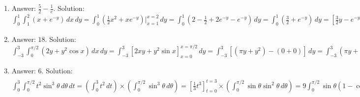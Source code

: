 \begin{Answer}[ref = iterate_1]
\begin{enumerate}
\item Answer: $\frac{5}{2} - \frac{1}{e}$. Solution: $\int_0^1 \int_1^2 \left( 
x + e^{-y} \right)\,dx\,dy = \int_0^1 \left( \frac{1}{2}x^2 + xe^{-y} \right)
|_{x=1}^{x=2}\,dy = \int_0^1 \left( 2 - \frac{1}{2} + 2e^{-y} - e^{-y} \right)
\,dy = \int_0^1 \left( \frac{3}{2} + e^{-y} \right)\,dy = \left[ \frac{3}{2}y 
- e^{-y} \right]_{y = 0}^{y = 1} = \left( \frac{3}{2}(1) - e^{-1} \right) - 
\left( \frac{3}{2}(0) - e^0 \right) = \frac{5}{2} - \frac{1}{e}$
\item Answer: $18$. Solution: $\int_{-3}^3 \int_{0}^{\pi/2} \left( 2y + y^2 
\cos{x} \right)\,dx\,dy = \int_{-3}^3 \left[ 2xy + y^2 \sin{x} \right]_{x = 0}^
{x = \pi/2}\,dy = \int_{-3}^3 \left[ \left( \pi y + y^2 \right) - \left( 0 + 0 
\right) \right]\,dy = \int_{-3}^3 \left( \pi y + y^2 \right)\,dy = \left[ 
\frac{\pi}{2}y^2 + \frac{1}{3}y^3 \right]_{y = -3}^{y = 3} = \left( \frac{\pi}{
2}(9) + \frac{1}{3}(27) \right) - \left( \frac{\pi}{2}(9) + \frac{1}{3}(-27) 
\right) = 9 - (-9) = 18$
\item Answer: $6$. Solution: $\int_0^3 \int_0^{\pi/2} t^2 \sin^3{\theta}\,
d\theta\,dt = \left( \int_0^3 t^2\,dt \right) \times \left( \int_0^{\pi/2} 
\sin^3{\theta}\,d\theta \right) = \left[ \frac{1}{3}t^3 \right]_{t = 0}^{t = 3}
\times \left( \int_0^{\pi/2} \sin{\theta} \sin^2{\theta}\,d\theta \right) = 9
\int_0^{\pi/2} \sin{\theta} \left( 1 - \cos^2{\theta} \right)\,d\theta = 9 
\left[ \int_0^{\pi/2} \sin{\theta}\,d\theta - \int_0^{\pi/2} \sin{\theta}
\cos^2{\theta}\,d\theta \right] = 9 \left[ \left( -\cos{\theta} \right) |_{
\theta = 0}^{\theta = \pi/2} + \left( \frac{1}{3}\cos^3{\theta} \right)|_{
\theta = 0}^{\theta = \pi/2} \right] = 9 \left[ -(-\cos{0}) + (-\frac{1}{3}
\cos^3{0}) \right] = 9 \left( 1 - \frac{1}{3} \right) = 9 \left( \frac{2}{3} 
\right) = 6$
\end{enumerate}
\end{Answer}

